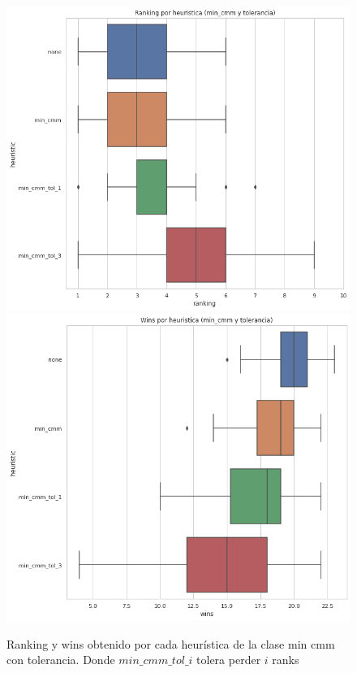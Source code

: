 \documentclass[a4paper]{article}
\begin{document}
\begin{figure}[H]
    \begin{center}
        \includegraphics[scale=0.45]{img/heur/ranking-min-cmm.png}
        \includegraphics[scale=0.45]{img/heur/wins-min-cmm.png}
        \caption{Ranking y wins obtenido por cada heurística de la clase min cmm con tolerancia. Donde $min\_cmm\_tol\_i$ tolera perder $i$ ranks}
        \label{heur-min-cmm-tol}
    \end{center}
\end{figure}
\end{document}
